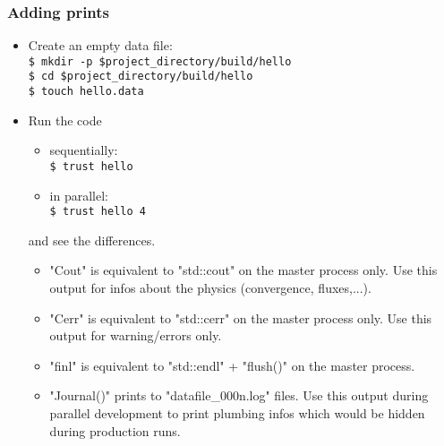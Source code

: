 \documentclass[10pt, hyperref={unicode=true,pdfusetitle, bookmarks=true,bookmarksnumbered=false,bookmarksopen=false, breaklinks=false,pdfborder={0 0 1},backref=true,colorlinks=true,linkcolor=darkblue,pageanchor, urlcolor=darkblue}]{beamer}
\begin{document}
\begin{frame}
\frametitle{Adding prints}
\begin{block}{}

\begin{itemize}
\item Create an empty data file:\\
\texttt{\$ mkdir -p \$project\_directory/build/hello}\\
\texttt{\$ cd \$project\_directory/build/hello}\\
\texttt{\$ touch hello.data}\\

\item Run the code 
\begin{itemize}
\item sequentially:\\
\texttt{\$ trust hello}
\item in parallel:\\
\texttt{\$ trust hello 4}
\end{itemize} 
and see the differences.


\begin{itemize}
\item "Cout" is equivalent to "std::cout" on the master process only.
Use this output for infos about the physics (convergence, fluxes,...).

\item "Cerr" is equivalent to "std::cerr" on the master process only.
Use this output for warning/errors only.

\item "finl" is equivalent to "std::endl" + "flush()" on the master process.

\item "Journal()" prints to "datafile\_000n.log" files.
Use this output during parallel development to print plumbing infos which would be hidden during production runs.
\end{itemize}
\end{itemize}

\end{block}
\end{frame}
\end{document}

